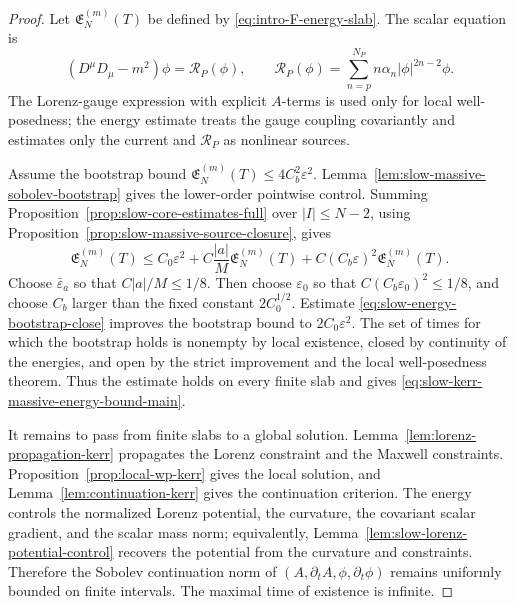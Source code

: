 \documentclass[11pt]{article}
\numberwithin{equation}{section}
\theoremstyle{plain}
\theoremstyle{definition}
\theoremstyle{remark}
\begin{document}
\begin{proof}
Let \(\mathfrak E_N^{(m)}(T)\) be defined by \eqref{eq:intro-F-energy-slab}.  The scalar equation is
\begin{equation}\label{eq:slow-massive-scalar-equation}
(D^\mu D_\mu-m^2)\phi=\mathcal R_P(\phi),
\qquad
\mathcal R_P(\phi)=\sum_{n=p}^{N_P}n\alpha_n|\phi|^{2n-2}\phi.
\end{equation}
The Lorenz-gauge expression with explicit \(A\)-terms is used only for local well-posedness; the energy estimate treats the gauge coupling covariantly and estimates only the current and \(\mathcal R_P\) as nonlinear sources.

Assume the bootstrap bound \(\mathfrak E_N^{(m)}(T)\le4C_b^2\varepsilon^2\).  Lemma~\ref{lem:slow-massive-sobolev-bootstrap} gives the lower-order pointwise control.  Summing Proposition~\ref{prop:slow-core-estimates-full} over \(|I|\le N-2\), using Proposition~\ref{prop:slow-massive-source-closure}, gives
\begin{equation}\label{eq:slow-energy-bootstrap-close}
\mathfrak E_N^{(m)}(T)
\le
C_0\varepsilon^2
+C\frac{|a|}{M}\mathfrak E_N^{(m)}(T)
+C(C_b\varepsilon)^2\mathfrak E_N^{(m)}(T).
\end{equation}
Choose \(\bar\varepsilon_a\) so that \(C|a|/M\le1/8\).  Then choose \(\varepsilon_0\) so that \(C(C_b\varepsilon_0)^2\le1/8\), and choose \(C_b\) larger than the fixed constant \(2C_0^{1/2}\).  Estimate \eqref{eq:slow-energy-bootstrap-close} improves the bootstrap bound to \(2C_0\varepsilon^2\).  The set of times for which the bootstrap holds is nonempty by local existence, closed by continuity of the energies, and open by the strict improvement and the local well-posedness theorem.  Thus the estimate holds on every finite slab and gives \eqref{eq:slow-kerr-massive-energy-bound-main}.

It remains to pass from finite slabs to a global solution.  Lemma~\ref{lem:lorenz-propagation-kerr} propagates the Lorenz constraint and the Maxwell constraints.  Proposition~\ref{prop:local-wp-kerr} gives the local solution, and Lemma~\ref{lem:continuation-kerr} gives the continuation criterion.  The energy controls the normalized Lorenz potential, the curvature, the covariant scalar gradient, and the scalar mass norm; equivalently, Lemma~\ref{lem:slow-lorenz-potential-control} recovers the potential from the curvature and constraints.  Therefore the Sobolev continuation norm of \((A,\partial_tA,\phi,\partial_t\phi)\) remains uniformly bounded on finite intervals.  The maximal time of existence is infinite.
\end{proof}
\end{document}
